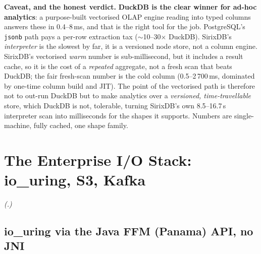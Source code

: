 \documentclass[11pt,a4paper,oneside]{report}
\theoremstyle{sirixthm}
\newcommand{\code}[1]{\texttt{#1}}
\begin{document}
\begin{honesty}
\small\textbf{Caveat, and the honest verdict.} \textbf{DuckDB is the clear winner for ad-hoc analytics}:
a purpose-built vectorised OLAP engine reading into typed columns answers these in 0.4--8\,ms, and that
is the right tool for the job. PostgreSQL's \code{jsonb} path pays a per-row extraction tax ($\sim$10--30$\times$
DuckDB). SirixDB's \emph{interpreter} is the slowest by far, it is a versioned node store, not a column
engine. SirixDB's vectorised \emph{warm} number is sub-millisecond, but it includes a result cache, so it
is the cost of a \emph{repeated} aggregate, not a fresh scan that beats DuckDB; the fair fresh-scan number
is the cold column (0.5--2\,700\,ms, dominated by one-time column build and JIT). The point of the
vectorised path is therefore not to out-run DuckDB but to make analytics over a \emph{versioned,
time-travellable} store, which DuckDB is not, tolerable, turning SirixDB's own 8.5--16.7\,s interpreter
scan into milliseconds for the shapes it supports. Numbers are single-machine, fully cached, one shape
family.
\end{honesty}

\chapter{The Enterprise I/O Stack: io\_uring, S3, Kafka}
\label{ch:enterprise}

\noindent\textit{(.)}

\section{io\_uring via the Java FFM (Panama) API, no JNI}
\end{document}
